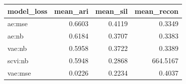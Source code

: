 \begin{tabular}{lrrr}
\toprule
model\_loss & mean\_ari & mean\_sil & mean\_recon \\
\midrule
ae:mse & 0.6603 & 0.4119 & 0.3349 \\
ae:nb & 0.6184 & 0.3707 & 0.3383 \\
vae:nb & 0.5958 & 0.3722 & 0.3389 \\
scvi:nb & 0.5948 & 0.2868 & 664.5167 \\
vae:mse & 0.0226 & 0.2234 & 0.4037 \\
\bottomrule
\end{tabular}
